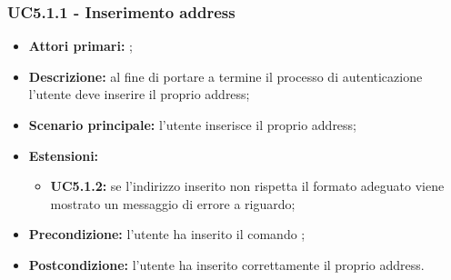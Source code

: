 \subsubsection{UC5.1.1 - Inserimento address}
\begin{itemize}
	\item \textbf{Attori primari:} \una{};
	\item \textbf{Descrizione:} al fine di portare a termine il processo di autenticazione l’utente deve inserire il proprio address; 
	\item \textbf{Scenario principale:} l’utente inserisce il proprio address;  
	\item \textbf{Estensioni:} 
	\begin{itemize}
		\item \textbf{UC5.1.2:} se l’indirizzo inserito non rispetta il formato adeguato viene mostrato un messaggio di errore a riguardo; 
	\end{itemize}
	\item \textbf{Precondizione:} l’utente ha inserito il comando \login{}; 
	\item \textbf{Postcondizione:} l’utente ha inserito correttamente il proprio address.
\end{itemize}